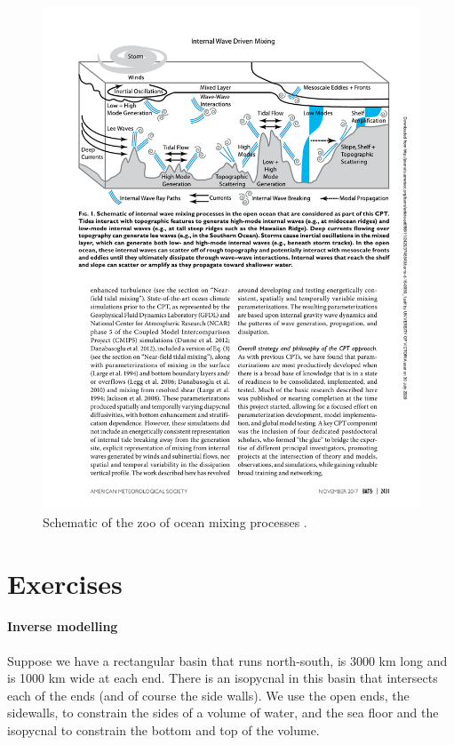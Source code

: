 \begin{figure}[hbt]
  \begin{center}
    \includegraphics{figs/WaterMasses/MacKinnonEtAl17Fig1}
    \caption{Schematic of the zoo of ocean mixing processes \citep{MacKinnonEtAl17}.}
    \label{fig:MacKinnonEtAl17Fig1}  
  \end{center}
\end{figure}

\section{Exercises}

\paragraph{Inverse modelling}

Suppose we have a rectangular basin that runs north-south, is 3000 km long and is 1000 km wide at each end. There is an isopycnal in this basin that intersects each of the ends (and of course the side walls).  We use the open ends, the sidewalls, to constrain the sides of a volume of water, and the sea floor and the isopycnal to constrain the bottom and top of the volume.  

